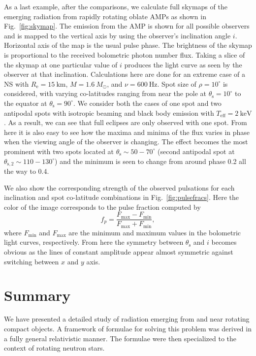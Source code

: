 \documentclass{aa}
\newcommand{\be}{\begin{equation}}
\newcommand{\ee}{\end{equation}}
\newcommand{\Msun}{\ensuremath{M_{\odot}}}
\begin{document}
As a last example, after the comparisons, we calculate full skymaps of the emerging radiation from rapidly rotating oblate AMPs as shown in Fig.~\ref{fig:skymap}.
The emission from the AMP is shown for all possible observers and is mapped to the vertical axis by using the observer's inclination angle $i$.
Horizontal axis of the map is the usual pulse phase.
The brightness of the skymap is proportional to the received bolometric photon number flux.
Taking a slice of the skymap at one particular value of $i$ produces the light curve as seen by the observer at that inclination.
Calculations here are done for an extreme case of a NS with $R_{\mathrm{e}} = 15~\mathrm{km}$, $M=1.6~\Msun$, and $\nu = 600~\mathrm{Hz}$.
Spot size of $\rho = 10^{\circ}$ is considered, with varying co-latitudes ranging from near the pole at $\theta_{\mathrm{s}} = 10^{\circ}$ to the equator at $\theta_{\mathrm{s}} = 90^{\circ}$.
We consider both the cases of one spot and two antipodal spots with isotropic beaming and black body emission with $T_{\mathrm{eff}} = 2~\mathrm{keV}$.
As a result, we can see that full eclipses are only observed with one spot.
From here it is also easy to see how the maxima and minima of the flux varies in phase when the viewing angle of the observer is changing.
The effect becomes the most prominent with two spots located at $\theta_{\mathrm{s}} \sim 50-70^{\circ}$ (second antipodal spot at $\theta_{\mathrm{s,2}} \sim 110-130^{\circ}$) and the minimum is seen to change from around phase 0.2 all the way to 0.4.

We also show the corresponding strength of the observed pulsations for each inclination and spot co-latitude combinations in Fig.~\ref{fig:pulsefracs}.
Here the color of the image corresponds to the pulse fraction computed by
\be
f_p = \frac{F_{\mathrm{max}} - F_{\mathrm{min}}}{F_{\mathrm{max}} + F_{\mathrm{min}}},
\ee
where $F_{\mathrm{min}}$ and $F_{\mathrm{max}}$ are the minimum and maximum values in the bolometric light curves, respectively.
From here the symmetry between $\theta_{\mathrm{s}}$ and $i$ becomes obvious as the lines of constant amplitude appear almost symmetric against switching between $x$ and $y$ axis.




\section{Summary}\label{sect:summary}
We have presented a detailed study of radiation emerging from and near rotating compact objects.
A framework of formulae for solving this problem was derived in a fully general relativistic manner. The formulae were then specialized to the context of rotating neutron stars.
\end{document}
